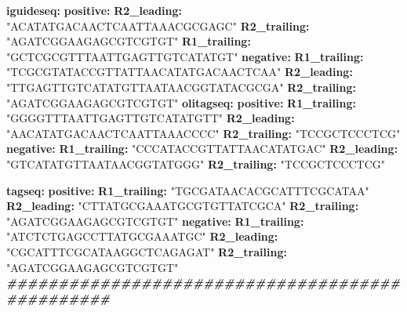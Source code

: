 \documentclass[
]{article}
\newenvironment{Shaded}{\begin{snugshade}}{\end{snugshade}}
\newcommand{\AttributeTok}[1]{\textcolor[rgb]{0.74,0.68,0.62}{#1}}
\newcommand{\CommentTok}[1]{\textcolor[rgb]{0.00,0.40,1.00}{\textbf{\textit{#1}}}}
\newcommand{\FunctionTok}[1]{\textcolor[rgb]{1.00,0.58,0.35}{\textbf{#1}}}
\newcommand{\KeywordTok}[1]{\textcolor[rgb]{0.26,0.66,0.93}{\textbf{#1}}}
\newcommand{\StringTok}[1]{\textcolor[rgb]{0.02,0.61,0.04}{#1}}
\begin{document}
\begin{Shaded}
\begin{Highlighting}[]
\FunctionTok{iguideseq}\KeywordTok{:}
\AttributeTok{  }\FunctionTok{positive}\KeywordTok{:}
\AttributeTok{    }\FunctionTok{R2\_leading}\KeywordTok{:}\AttributeTok{ }\StringTok{"ACATATGACAACTCAATTAAACGCGAGC"}
\AttributeTok{    }\FunctionTok{R2\_trailing}\KeywordTok{:}\AttributeTok{ }\StringTok{"AGATCGGAAGAGCGTCGTGT"}
\AttributeTok{    }\FunctionTok{R1\_trailing}\KeywordTok{:}\AttributeTok{ }\StringTok{"GCTCGCGTTTAATTGAGTTGTCATATGT"}
\AttributeTok{  }\FunctionTok{negative}\KeywordTok{:}
\AttributeTok{    }\FunctionTok{R1\_trailing}\KeywordTok{:}\AttributeTok{ }\StringTok{"TCGCGTATACCGTTATTAACATATGACAACTCAA"}
\AttributeTok{    }\FunctionTok{R2\_leading}\KeywordTok{:}\AttributeTok{ }\StringTok{"TTGAGTTGTCATATGTTAATAACGGTATACGCGA"}
\AttributeTok{    }\FunctionTok{R2\_trailing}\KeywordTok{:}\AttributeTok{ }\StringTok{"AGATCGGAAGAGCGTCGTGT"}
\AttributeTok{    }
\AttributeTok{    }
\AttributeTok{    }
\FunctionTok{olitagseq}\KeywordTok{:}
\AttributeTok{  }\FunctionTok{positive}\KeywordTok{:}
\AttributeTok{    }\FunctionTok{R1\_trailing}\KeywordTok{:}\AttributeTok{ }\StringTok{"GGGGTTTAATTGAGTTGTCATATGTT"}
\AttributeTok{    }\FunctionTok{R2\_leading}\KeywordTok{:}\AttributeTok{ }\StringTok{"AACATATGACAACTCAATTAAACCCC"}
\AttributeTok{    }\FunctionTok{R2\_trailing}\KeywordTok{:}\AttributeTok{ }\StringTok{"TCCGCTCCCTCG"}
\AttributeTok{  }\FunctionTok{negative}\KeywordTok{:}
\AttributeTok{    }\FunctionTok{R1\_trailing}\KeywordTok{:}\AttributeTok{ }\StringTok{"CCCATACCGTTATTAACATATGAC"}
\AttributeTok{    }\FunctionTok{R2\_leading}\KeywordTok{:}\AttributeTok{ }\StringTok{"GTCATATGTTAATAACGGTATGGG"}
\AttributeTok{    }\FunctionTok{R2\_trailing}\KeywordTok{:}\AttributeTok{ }\StringTok{"TCCGCTCCCTCG"}

\FunctionTok{tagseq}\KeywordTok{:}
\AttributeTok{  }\FunctionTok{positive}\KeywordTok{:}
\AttributeTok{    }\FunctionTok{R1\_trailing}\KeywordTok{:}\AttributeTok{ }\StringTok{"TGCGATAACACGCATTTCGCATAA"}
\AttributeTok{    }\FunctionTok{R2\_leading}\KeywordTok{:}\AttributeTok{ }\StringTok{"CTTATGCGAAATGCGTGTTATCGCA"}
\AttributeTok{    }\FunctionTok{R2\_trailing}\KeywordTok{:}\AttributeTok{ }\StringTok{"AGATCGGAAGAGCGTCGTGT"}
\AttributeTok{  }\FunctionTok{negative}\KeywordTok{:}
\AttributeTok{    }\FunctionTok{R1\_trailing}\KeywordTok{:}\AttributeTok{ }\StringTok{"ATCTCTGAGCCTTATGCGAAATGC"}
\AttributeTok{    }\FunctionTok{R2\_leading}\KeywordTok{:}\AttributeTok{ }\StringTok{"CGCATTTCGCATAAGGCTCAGAGAT"}
\AttributeTok{    }\FunctionTok{R2\_trailing}\KeywordTok{:}\AttributeTok{ }\StringTok{"AGATCGGAAGAGCGTCGTGT"}
\CommentTok{\#\#\#\#\#\#\#\#\#\#\#\#\#\#\#\#\#\#\#\#\#\#\#\#\#\#\#\#\#\#\#\#\#\#\#\#\#\#\#\#\#\#\#\#\#\#\#\#}
\end{Highlighting}
\end{Shaded}
\end{document}
